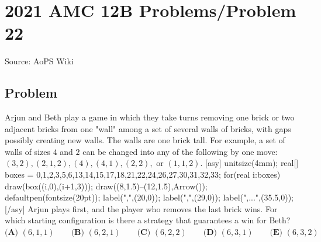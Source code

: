 \documentclass[12pt]{article}
\begin{document}
\section*{{2021 AMC 12B Problems/Problem 22}}
Source: AoPS Wiki

\subsection*{Problem}
Arjun and Beth play a game in which they take turns removing one brick or two adjacent bricks from one "wall" among a set of several walls of bricks, with gaps possibly creating new walls. The walls are one brick tall. For example, a set of walls of sizes $4$ and $2$ can be changed into any of the following by one move: $(3,2),(2,1,2),(4),(4,1),(2,2),$ or $(1,1,2).$ [asy] unitsize(4mm); real[] boxes = {0,1,2,3,5,6,13,14,15,17,18,21,22,24,26,27,30,31,32,33}; for(real i:boxes){ draw(box((i,0),(i+1,3))); } draw((8,1.5)--(12,1.5),Arrow()); defaultpen(fontsize(20pt)); label(",",(20,0)); label(",",(29,0)); label(",...",(35.5,0)); [/asy] Arjun plays first, and the player who removes the last brick wins. For which starting configuration is there a strategy that guarantees a win for Beth? $\textbf{(A) }(6,1,1) \qquad \textbf{(B) }(6,2,1) \qquad \textbf{(C) }(6,2,2)\qquad \textbf{(D) }(6,3,1) \qquad \textbf{(E) }(6,3,2)$
\end{document}
